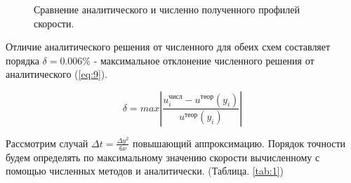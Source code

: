 \begin{figure}[H]
    \centering
    \hfill 
    \caption{Сравнение аналитического и численно полученного профилей скорости.}
    \label{fig:9}
\end{figure}

Отличие аналитического решения от численного для обеих схем составляет порядка $\delta = 0.006\%$ - максимальное отклонение численного решения от аналитического (\ref{eq:9}).

\begin{equation}
    \delta = max\left| \frac{u_i^\text{числ}-u^\text{теор}(y_i)}{u^\text{теор}(y_i)}\right|
\label{eq:9}
\end{equation}

Рассмотрим случай $\Delta t = \frac{\Delta y^2}{6\nu}$ повышающий аппроксимацию. Порядок точности будем определять по максимальному значению скорости вычисленному с помощью численных методов и аналитически.  (Таблица. \ref{tab:1})

\begin{table}[H]
    \centering
\caption{Сравнение точности повышающего порядок аппроксимации схемы.}
\label{tab:1}
\end{table}


